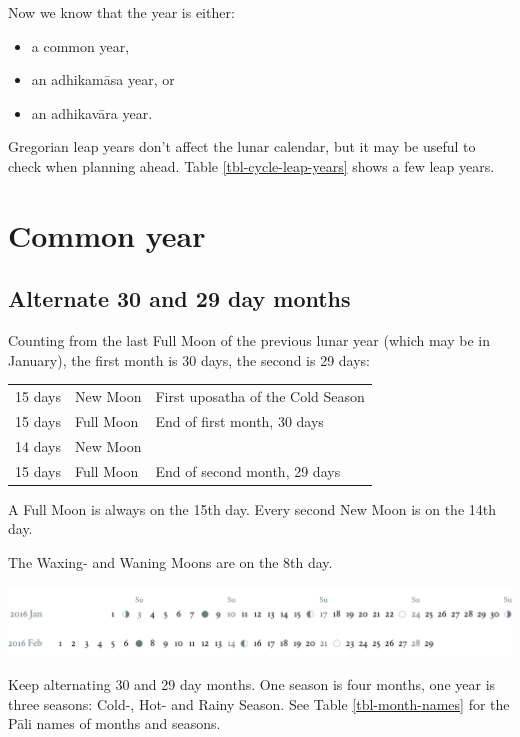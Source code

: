 \documentclass[11pt,oneside]{memoir-article}
\begin{document}
Now we know that the year is either:

\begin{itemize}
\item a common year,
\item an adhikamāsa year, or
\item an adhikavāra year.
\end{itemize}

Gregorian leap years don't affect the lunar calendar, but it may be useful to
check when planning ahead. Table \ref{tbl-cycle-leap-years} shows a few leap
years.

\section{Common year}
\label{sec-1-2}
\label{common-year}
\subsection{Alternate 30 and 29 day months}
\label{sec-1-2-1}

Counting from the last Full Moon of the previous lunar year (which may
be in January), the first month is 30 days, the second is 29 days:

\begin{center}
\begin{tabular}{lll}
15 days & \GaNewmoon{} New Moon & First uposatha of the Cold Season\\
15 days & \GaFullmoon{} Full Moon & End of first month, 30 days\\
14 days & \GaNewmoon{} New Moon & \\
15 days & \GaFullmoon{} Full Moon & End of second month, 29 days\\
\end{tabular}
\end{center}

A Full Moon is always on the 15th day. Every second New Moon is on the 14th day.

The \GaWaxingmoon{} Waxing- and \GaWaningmoon{} Waning Moons are on the 8th day.

\includegraphics[width=\linewidth]{two-months.pdf}

Keep alternating 30 and 29 day months. One season is four months, one year is
three seasons: Cold-, Hot- and Rainy Season. See Table \ref{tbl-month-names} for
the Pāli names of months and seasons.
\end{document}
